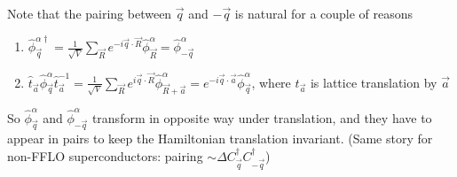 Note that the pairing between $\vec{q}$ and $-\vec{q}$ is natural for a couple of reasons
\begin{enumerate}
    \item $\hat{\phi}_{\vec{q}}^{\alpha \dagger}=\frac{1}{\sqrt{V}}\sum_{\vec{R}}{e^{-i\vec{q}\cdot \vec{R}}\hat{\phi}_{\vec{R}}^{\alpha}}=\hat{\phi}_{-\vec{q}}^{\alpha}$
    \item $\hat{t}_{\vec{a}}\hat{\phi}_{\vec{q}}^{\alpha}\hat{t}_{\vec{a}}^{-1}=\frac{1}{\sqrt{V}}\sum_{\vec{R}}{e^{i\vec{q}\cdot \vec{R}}\hat{\phi}_{\vec{R}+\vec{a}}^{\alpha}}=e^{-i\vec{q}\cdot \vec{a}}\hat{\phi}_{\vec{q}}^{\alpha}$, where $\hat{t}_{\vec{a}}$ is lattice translation by $\vec{a}$
\end{enumerate}
So $\hat{\phi}_{\vec{q}}^\alpha$ and $\hat{\phi}_{-\vec{q}}^\alpha$ transform in opposite way under translation, and they have to appear in pairs to keep the Hamiltonian translation invariant. (Same story for non-FFLO superconductors: pairing $\sim\Delta C_{\vec{q}}^\dagger C_{-\vec{q}}^\dagger$)

